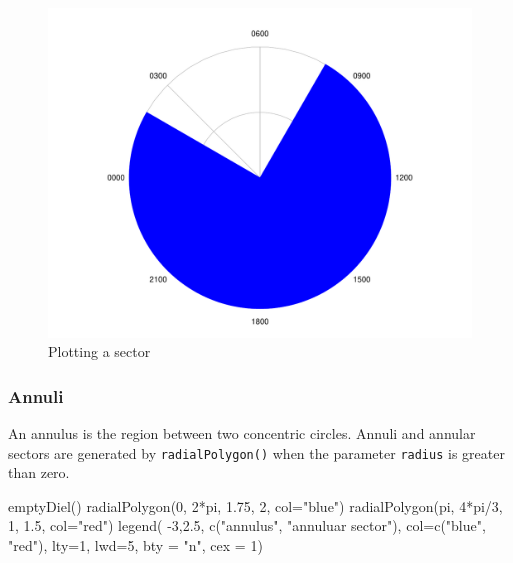 \documentclass[
]{book}
\newenvironment{Shaded}{\begin{snugshade}}{\end{snugshade}}
\newcommand{\AttributeTok}[1]{\textcolor[rgb]{0.77,0.63,0.00}{#1}}
\newcommand{\DecValTok}[1]{\textcolor[rgb]{0.00,0.00,0.81}{#1}}
\newcommand{\FloatTok}[1]{\textcolor[rgb]{0.00,0.00,0.81}{#1}}
\newcommand{\FunctionTok}[1]{\textcolor[rgb]{0.00,0.00,0.00}{#1}}
\newcommand{\NormalTok}[1]{#1}
\newcommand{\SpecialCharTok}[1]{\textcolor[rgb]{0.00,0.00,0.00}{#1}}
\newcommand{\StringTok}[1]{\textcolor[rgb]{0.31,0.60,0.02}{#1}}
\begin{document}
\begin{figure}

{\centering \includegraphics[width=0.9\linewidth]{_main_files/figure-latex/radialPolygon-sector2-1} 

}

\caption{Plotting a sector}\label{fig:radialPolygon-sector2}
\end{figure}

\hypertarget{annuli}{%
\subsubsection{Annuli}\label{annuli}}

An annulus is the region between two concentric circles. Annuli and annular sectors are generated by \texttt{radialPolygon()} when the parameter \texttt{radius} is greater than zero.

\begin{Shaded}
\begin{Highlighting}[]
\FunctionTok{emptyDiel}\NormalTok{()}
\FunctionTok{radialPolygon}\NormalTok{(}\DecValTok{0}\NormalTok{, }\DecValTok{2}\SpecialCharTok{*}\NormalTok{pi, }\FloatTok{1.75}\NormalTok{, }\DecValTok{2}\NormalTok{, }\AttributeTok{col=}\StringTok{"blue"}\NormalTok{)}
\FunctionTok{radialPolygon}\NormalTok{(pi, }\DecValTok{4}\SpecialCharTok{*}\NormalTok{pi}\SpecialCharTok{/}\DecValTok{3}\NormalTok{, }\DecValTok{1}\NormalTok{, }\FloatTok{1.5}\NormalTok{, }\AttributeTok{col=}\StringTok{"red"}\NormalTok{)}
\FunctionTok{legend}\NormalTok{(}
  \SpecialCharTok{{-}}\DecValTok{3}\NormalTok{,}\FloatTok{2.5}\NormalTok{,}
  \FunctionTok{c}\NormalTok{(}\StringTok{"annulus"}\NormalTok{, }\StringTok{"annuluar sector"}\NormalTok{),}
  \AttributeTok{col=}\FunctionTok{c}\NormalTok{(}\StringTok{"blue"}\NormalTok{, }\StringTok{"red"}\NormalTok{),}
  \AttributeTok{lty=}\DecValTok{1}\NormalTok{,}
  \AttributeTok{lwd=}\DecValTok{5}\NormalTok{,}
  \AttributeTok{bty =} \StringTok{"n"}\NormalTok{,}
  \AttributeTok{cex =} \DecValTok{1}\NormalTok{)}
\end{Highlighting}
\end{Shaded}
\end{document}
